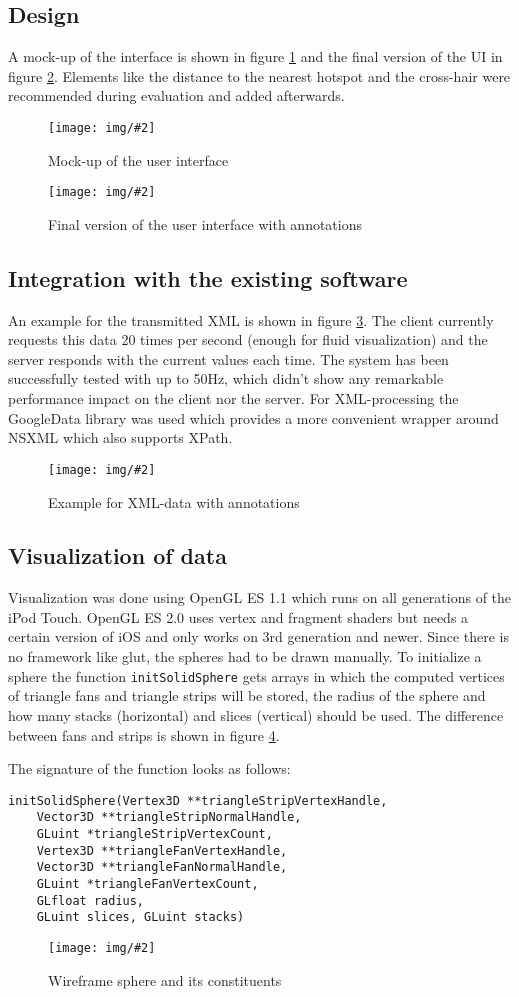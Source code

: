 \documentclass{scrartcl}
\newcommand{\graphic}[3][width=\linewidth] %
{
  \begin{figure}[h!t]
    \centering
    \texttt{[image: img/\#2]}
    \caption{#3}
    \label{fig:#2}
  \end{figure}
}
\newcommand{\refFigure}[1]{figure \ref{fig:#1}}
\begin{document}
\subsection{Design}
A mock-up of the interface is shown in \refFigure{mockup} and the final version of the UI in \refFigure{screen-annotated}. Elements like the distance to the nearest hotspot and the cross-hair were recommended during evaluation and added afterwards.
\graphic[scale=.5]{mockup}{Mock-up of the user interface}
\graphic[scale=.5]{screen-annotated}{Final version of the user interface with annotations}


\subsection{Integration with the existing software}
An example for the transmitted XML is shown in \refFigure{data}. The client currently requests this data 20 times per second (enough for fluid visualization) and the server responds with the current values each time. The system has been successfully tested with up to 50Hz, which didn't show any remarkable performance impact on the client nor the server.
For XML-processing the GoogleData library was used which provides a more convenient wrapper around NSXML which also supports XPath.
\graphic[scale=.5]{data}{Example for XML-data with annotations}


\subsection{Visualization of data}
Visualization was done using OpenGL ES 1.1 which runs on all generations of the iPod Touch. OpenGL ES 2.0 uses vertex and fragment shaders but needs a certain version of iOS and only works on 3rd generation and newer.
Since there is no framework like glut, the spheres had to be drawn manually. To initialize a sphere the function \verb|initSolidSphere| gets arrays in which the computed vertices of triangle fans and triangle strips will be stored, the radius of the sphere and how many stacks (horizontal) and slices (vertical) should be used.
The difference between fans and strips is shown in \refFigure{sphere}.

The signature of the function looks as follows:
\begin{verbatim}
initSolidSphere(Vertex3D **triangleStripVertexHandle,
    Vector3D **triangleStripNormalHandle,
    GLuint *triangleStripVertexCount,
    Vertex3D **triangleFanVertexHandle,
    Vector3D **triangleFanNormalHandle,
    GLuint *triangleFanVertexCount,
    GLfloat radius,
    GLuint slices, GLuint stacks)
\end{verbatim}
\graphic[scale=.5]{sphere}{Wireframe sphere and its constituents}
\end{document}
